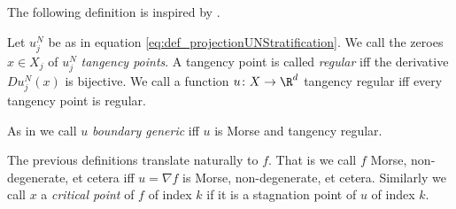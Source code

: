 The following definition is inspired by \cite{Katz2014}.
\begin{definition}
  Let $u^N_j$ be as in equation \eqref{eq:def_projectionUNStratification}.
  We call the zeroes $x\in X_j$ of $u^N_j$ \emph{tangency points}.
  A tangency point is called \emph{regular} iff the derivative $Du^N_j(x)$ is bijective.
  We call a function $u\colon X\to\R^d$ tangency regular iff every tangency point
  is regular.
\end{definition}

As in \cite{Katz2014} we call $u$ \emph{boundary generic} iff $u$ is Morse and tangency regular.

The previous definitions translate naturally to $f$.
That is we call $f$ Morse, non-degenerate, et cetera iff $u=\nabla f$ is Morse, non-degenerate, et cetera.
Similarly we call $x$ a \emph{critical point} of $f$ of index $k$ if it is a
stagnation point of $u$ of index $k$.

